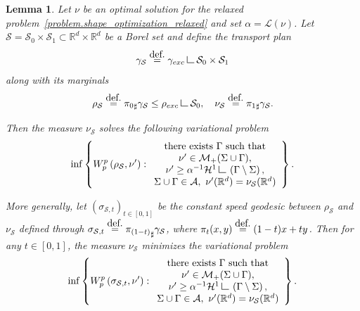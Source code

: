 \documentclass[11pt]{article}
\numberwithin{equation}{section}
\newtheorem{lemma}[theorem]{Lemma}
\theoremstyle{definition}
\newcommand{\eqdef}{\ensuremath{\stackrel{\mbox{\upshape\tiny def.}}{=}}}
\newcommand\LM[1]{\hbox{\vrule width.5pt \vbox to#1pt{\vfill \hrule width#1pt height.5pt}}}
\newcommand\LL{{\mathchoice {\>\LM7\>}{\>\LM7\>}{\,\LM5\,}{\,\LM{3.35}\,}}}
\newcommand{\mres}{\LL}
\newcommand{\RR}{\mathbb{R}}
\newcommand{\rhoexc}{\rho_{\textup{exc}}}
\newcommand{\gammaexc}{\gamma_{\textup{exc}}}
\begin{document}
\begin{lemma}\label{lemma.auxiliary_problem}
Let $\nu$ be an optimal solution for the relaxed problem~\eqref{problem.shape_optimization_relaxed} and set $\alpha = \mathcal{L}(\nu)$. Let $\mathcal{S} = \mathcal{S}_0\times \mathcal{S}_1 \subset \RR^d\times \RR^d$ be a Borel set and define the transport plan
\[
\gamma_{\mathcal{S}} \eqdef \gammaexc \mres \mathcal{S}_0\times \mathcal{S}_1
\]
along with its marginals
\[
\rho_{\mathcal{S}} \eqdef {\pi_{0}}_\sharp\gamma_\mathcal{S}
\le \rhoexc \mres \mathcal{S}_0,
\quad \nu_{\mathcal{S}} \eqdef {\pi_{1}}_\sharp\gamma_{\mathcal{S}}.
\]

Then the measure $\nu_{\mathcal{S}}$ solves the following variational problem
\begin{equation}
\inf
\left\{
W_p^p\left(
\rho_{\mathcal{S}}, \nu'
\right) :
\begin{array}{c}
\text{there exists $\Gamma$ such that}\\
\nu' \in \mathcal{M}_+(\Sigma \cup \Gamma),\\
\nu' \ge \alpha^{-1}\mathcal{H}^1\mres \left(\Gamma\setminus \Sigma\right), \\
\Sigma \cup \Gamma \in \mathcal{A}, \
\nu'(\RR^d) = \nu_{\mathcal{S}}(\RR^d)
\end{array}
\right\}.
\end{equation}

More generally, let $\left(\sigma_{\mathcal{S},t}\right)_{t \in [0,1]}$ be the constant speed geodesic between $\rho_{\mathcal{S}}$ and $\nu_{\mathcal{S}}$ defined through $\sigma_{\mathcal{S},t} \eqdef {\pi_{(1-t)}}_\sharp\gamma_{\mathcal{S}}$, where $\pi_t(x,y) \eqdef (1-t)x + ty$. Then for any $t \in [0,1]$, the measure $\nu_{\mathcal{S}}$ minimizes the variational problem
\begin{equation}\label{auxiliary_problem_sigma}
\inf
\left\{
W_p^p\left(
\sigma_{\mathcal{S}, t}, \nu'
\right) :
\begin{array}{c}
\text{there exists $\Gamma$ such that}\\
\nu' \in \mathcal{M}_+(\Sigma \cup \Gamma),\\
\nu' \ge \alpha^{-1}\mathcal{H}^1\mres \left(\Gamma\setminus \Sigma\right), \\
\Sigma \cup \Gamma \in \mathcal{A}, \
\nu'(\RR^d) = \nu_{\mathcal{S}}(\RR^d)
\end{array}
\right\}.
\end{equation}
\end{lemma}
\end{document}
